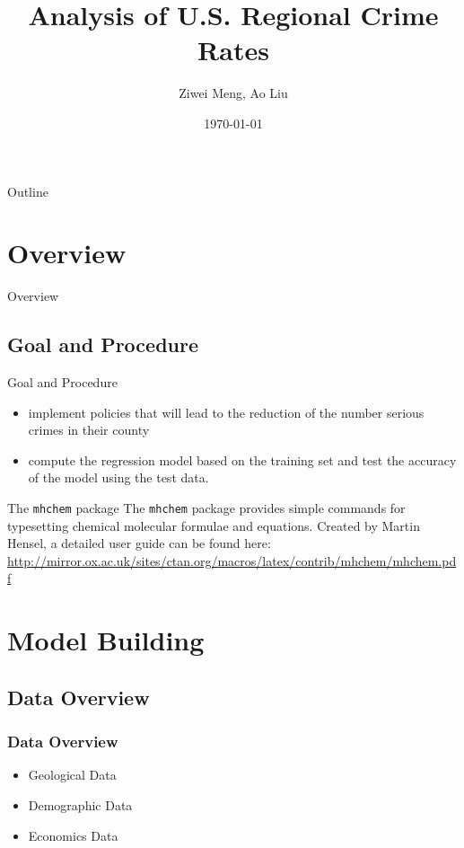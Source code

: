 \documentclass{beamer}
\title[Columbia University]{Analysis of U.S. Regional Crime Rates}
\author{Ziwei Meng, Ao Liu}
\date{\today}
\begin{document}
\begin{frame}
  \titlepage
\end{frame}

\begin{frame}{Outline}
  \tableofcontents
\end{frame}

\section{Overview}

\begin{frame}{Overview}

\end{frame}

\subsection{Goal and Procedure}
\begin{frame}{Goal and Procedure}

\begin{itemize}
\item implement policies that will lead to the reduction of the number serious crimes in their county
\item compute the regression model based on the training set and test the accuracy of the model using the test data.
\end{itemize}

\begin{block}{The \texttt{mhchem} package}
The \texttt{mhchem} package provides simple commands for typesetting chemical molecular formulae and equations. Created by Martin Hensel, a detailed user guide can be found here:\\[0.4cm]
\small{\url{http://mirror.ox.ac.uk/sites/ctan.org/macros/latex/contrib/mhchem/mhchem.pdf}}
\end{block}

\end{frame}

\section{Model Building}

\subsection{Data Overview}
\begin{frame}[fragile]
\frametitle{Data Overview}

\begin{itemize}
\item Geological Data
\item Demographic Data
\item Economics Data
\end{itemize}

\end{frame}
\end{document}
